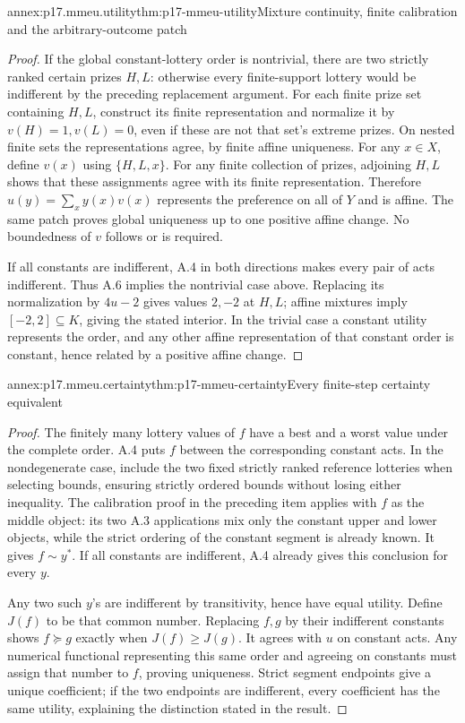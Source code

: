 \begin{annexitem}{annex:p17.mmeu.utility}{thm:p17-mmeu-utility}{Mixture continuity, finite calibration and the arbitrary-outcome patch}
\begin{proof}
If the global constant-lottery order is nontrivial,
there are two strictly ranked certain prizes \(H,L\):
otherwise every finite-support lottery would be
indifferent by the preceding replacement argument.
For each finite prize set containing \(H,L\), construct
its finite representation and normalize it by
\(v(H)=1,v(L)=0\), even if these are not that set's
extreme prizes. On nested finite sets the
representations agree, by finite affine uniqueness.
For any \(x\in X\), define \(v(x)\) using
\(\{H,L,x\}\). For any finite collection of prizes,
adjoining \(H,L\) shows that these assignments agree
with its finite representation. Therefore
\(u(y)=\sum_x y(x)v(x)\) represents the preference
on all of \(Y\) and is affine. The same patch proves
global uniqueness up to one positive affine change.
No boundedness of \(v\) follows or is required.

If all constants are indifferent, A.4 in both
directions makes every pair of acts indifferent.
Thus A.6 implies the nontrivial case above.
Replacing its normalization by \(4u-2\) gives
values \(2,-2\) at \(H,L\); affine mixtures imply
\([-2,2]\subseteq K\), giving the stated interior.
In the trivial case a constant utility represents
the order, and any other affine representation of
that constant order is constant, hence related by
a positive affine change.
\end{proof}
\end{annexitem}

\begin{annexitem}{annex:p17.mmeu.certainty}{thm:p17-mmeu-certainty}{Every finite-step certainty equivalent}
\begin{proof}
The finitely many lottery values of \(f\) have a
best and a worst value under the complete order.
A.4 puts \(f\) between the corresponding constant
acts. In the nondegenerate case, include the two
fixed strictly ranked reference lotteries when
selecting bounds, ensuring strictly ordered bounds
without losing either inequality.
The calibration proof in the preceding item applies
with \(f\) as the middle object: its two A.3
applications mix only the constant upper and lower
objects, while the strict ordering of the constant
segment is already known. It gives \(f\sim y^*\).
If all constants are indifferent, A.4 already
gives this conclusion for every \(y\).

Any two such \(y\)'s are indifferent by
transitivity, hence have equal utility.
Define \(J(f)\) to be that common number.
Replacing \(f,g\) by their indifferent constants
shows \(f\succeq g\) exactly when \(J(f)\geq J(g)\).
It agrees with \(u\) on constant acts.
Any numerical functional representing this same
order and agreeing on constants must assign
that number to \(f\), proving uniqueness.
Strict segment endpoints give a unique coefficient;
if the two endpoints are indifferent, every
coefficient has the same utility, explaining
the distinction stated in the result.
\end{proof}
\end{annexitem}

